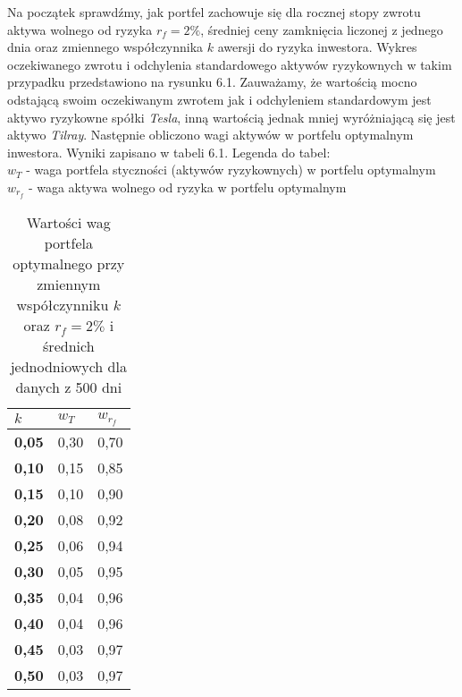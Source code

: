 \documentclass[magister]{dyplom}
\begin{document}
Na początek sprawdźmy, jak portfel zachowuje się dla rocznej stopy zwrotu aktywa wolnego od ryzyka $r_f = 2\%$, średniej ceny zamknięcia liczonej z jednego dnia oraz zmiennego współczynnika $k$ awersji do ryzyka inwestora. Wykres oczekiwanego zwrotu i odchylenia standardowego aktywów ryzykownych w takim przypadku przedstawiono na rysunku 6.1.
Zauważamy, że wartością mocno odstającą swoim oczekiwanym zwrotem jak i odchyleniem standardowym jest aktywo ryzykowne spółki \textit{Tesla}, inną wartością jednak mniej wyróżniającą się jest aktywo \textit{Tilray}.
Następnie obliczono wagi aktywów w portfelu optymalnym inwestora. Wyniki zapisano w tabeli 6.1.\newline
Legenda do tabel:\\
$w_T$ - waga portfela styczności (aktywów ryzykownych) w portfelu optymalnym\\
$w_{r_f}$ - waga aktywa wolnego od ryzyka w portfelu optymalnym\\
\begin{table}[ht]
	\centering
	\caption{Wartości wag portfela optymalnego przy zmiennym współczynniku $k$ oraz $r_f = 2\%$ i średnich jednodniowych dla danych z 500 dni}
	\begin{tabular}{|l|l|l|}
		\hline
		\textbf{$k$} & \textbf{$w_T$} & \textbf{$w_{r_f}$} \\ \hline
		\textbf{0,05}                                             & 0,30           & 0,70            \\ \hline
		\textbf{0,10}                                              & 0,15          & 0,85           \\ \hline
		\textbf{0,15}                                             & 0,10           & 0,90           \\ \hline
		\textbf{0,20}                                              & 0,08          & 0,92           \\ \hline
		\textbf{0,25}                                             & 0,06          & 0,94           \\ \hline
		\textbf{0,30}                                              & 0,05          & 0,95           \\ \hline
		\textbf{0,35}                                             & 0,04          & 0,96           \\ \hline
		\textbf{0,40}                                              & 0,04          & 0,96           \\ \hline
		\textbf{0,45}                                             & 0,03          & 0,97           \\ \hline
		\textbf{0,50}                                              & 0,03          & 0,97           \\ \hline
	\end{tabular}
\end{table}
\end{document}
